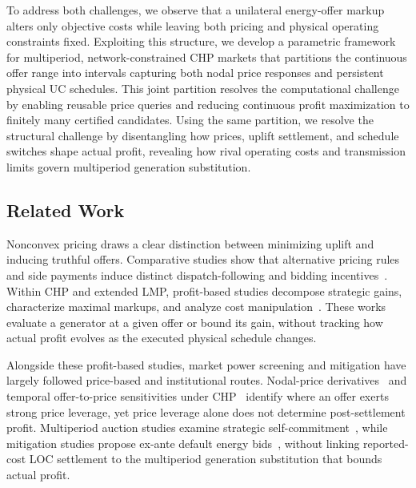\documentclass[journal]{IEEEtran}
\begin{document}
To address both challenges, we observe that a unilateral energy-offer markup alters only objective costs while leaving both pricing and physical operating constraints fixed. Exploiting this structure, we develop a parametric framework for multiperiod, network-constrained CHP markets that partitions the continuous offer range into intervals capturing both nodal price responses and persistent physical UC schedules. This joint partition resolves the computational challenge by enabling reusable price queries and reducing continuous profit maximization to finitely many certified candidates. Using the same partition, we resolve the structural challenge by disentangling how prices, uplift settlement, and schedule switches shape actual profit, revealing how rival operating costs and transmission limits govern multiperiod generation substitution.

\subsection{Related Work}
Nonconvex pricing draws a clear distinction between minimizing uplift and inducing truthful offers. Comparative studies show that alternative pricing rules and side payments induce distinct dispatch-following and bidding incentives~\cite{liberopoulos2016,wang2023incentive,chen2024comparison}. Within CHP and extended LMP, profit-based studies decompose strategic gains, characterize maximal markups, and analyze cost manipulation~\cite{sun2020market,sun2021strategic,wu2021potential}. These works evaluate a generator at a given offer or bound its gain, without tracking how actual profit evolves as the executed physical schedule changes.

Alongside these profit-based studies, market power screening and mitigation have largely followed price-based and institutional routes. Nodal-price derivatives~\cite{palka2017} and temporal offer-to-price sensitivities under CHP~\cite{sun2021temporal} identify where an offer exerts strong price leverage, yet price leverage alone does not determine post-settlement profit. Multiperiod auction studies examine strategic self-commitment~\cite{byers2022auction}, while mitigation studies propose ex-ante default energy bids~\cite{simoglou2024mitigation}, without linking reported-cost LOC settlement to the multiperiod generation substitution that bounds actual profit.
\end{document}
